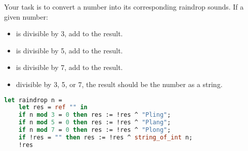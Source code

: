 Your task is to convert a number into its corresponding raindrop sounds.
If a given number:

\begin{itemize}
  \item is divisible by 3, add  to the result.
  \item is divisible by 5, add  to the result.
  \item is divisible by 7, add  to the result.
  \item {} divisible by 3, 5, or 7, the result should be the number as a string.
\end{itemize}

\begin{lstlisting}[language=OCaml]
let raindrop n =
	let res = ref "" in
	if n mod 3 = 0 then res := !res ^ "Pling";
	if n mod 5 = 0 then res := !res ^ "Plang";
	if n mod 7 = 0 then res := !res ^ "Plong";
	if !res = "" then res := !res ^ string_of_int n;
	!res
\end{lstlisting}

